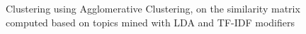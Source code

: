 \documentclass[11pt]{article}
\begin{document}
\begin{figure}[htp!]
  \centering
  \caption{Clustering using Agglomerative Clustering, on the similarity matrix computed based on topics mined with LDA and TF-IDF modifiers}
\end{figure}
\end{document}
